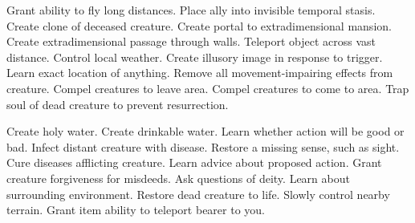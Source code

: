    {Grant ability to fly long distances.}
    {Place ally into invisible temporal stasis.}
    {Create clone of deceased creature.}
    {Create portal to extradimensional mansion.}
    {Create extradimensional passage through walls.}
    {Teleport object across vast distance.}
    {Control local weather.}
    {Create illusory image in response to trigger.}
    {Learn exact location of anything.}
    {Remove all movement-impairing effects from creature.}
    {Compel creatures to leave area.}
    {Compel creatures to come to area.}
    {Trap soul of dead creature to prevent resurrection.}

    {Create holy water.}
    {Create drinkable water.}
    {Learn whether action will be good or bad.}
    {Infect distant creature with disease.}
    {Restore a missing sense, such as sight.}
    {Cure diseases afflicting creature.}
    {Learn advice about proposed action.}
    {Grant creature forgiveness for misdeeds.}
    {Ask questions of deity.}
    {Learn about surrounding environment.}
    {Restore dead creature to life.}
    {Slowly control nearby terrain.}
    {Grant item ability to teleport bearer to you.}

